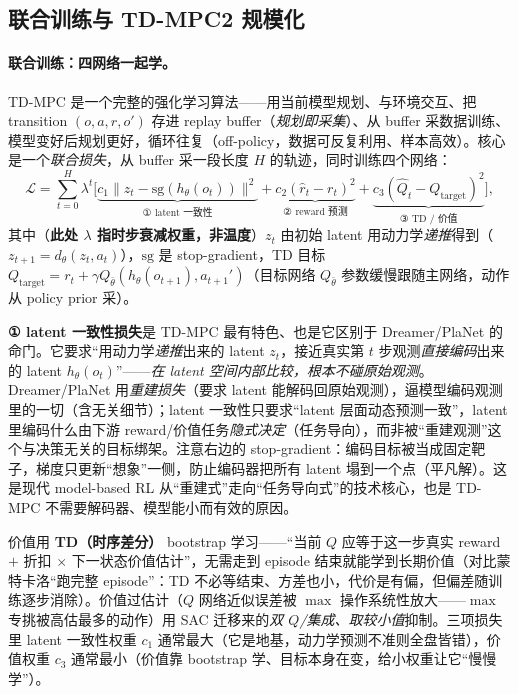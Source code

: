 \subsection{联合训练与 TD-MPC2 规模化}
\label{sec:mv-tdmpc-train}

\paragraph{联合训练：四网络一起学。}
TD-MPC 是一个完整的强化学习算法——用当前模型规划、与环境交互、把 transition $(o,a,r,o')$ 存进 replay buffer（\emph{规划即采集}）、从 buffer 采数据训练、模型变好后规划更好，循环往复（off-policy，数据可反复利用、样本高效）。核心是一个\emph{联合损失}，从 buffer 采一段长度 $H$ 的轨迹，同时训练四个网络\cite{hansen2022tdmpc}：
\begin{equation}
  \mathcal{L}=\sum_{t=0}^{H}\lambda^t\Big[\underbrace{c_1\|z_t-\mathrm{sg}(h_\theta(o_t))\|^2}_{\text{① latent 一致性}}+\underbrace{c_2(\hat r_t-r_t)^2}_{\text{② reward 预测}}+\underbrace{c_3(\hat Q_t-Q_{\text{target}})^2}_{\text{③ TD / 价值}}\Big],
  \label{eq:mv-tdmpc-loss}
\end{equation}
其中（\textbf{此处 $\lambda$ 指时步衰减权重，非温度}）$z_t$ 由初始 latent 用动力学\emph{递推}得到（$z_{t+1}=d_\theta(z_t,a_t)$），$\mathrm{sg}$ 是 stop-gradient，TD 目标 $Q_{\text{target}}=r_t+\gamma Q_{\bar\theta}(h_\theta(o_{t+1}),a_{t+1}')$（目标网络 $Q_{\bar\theta}$ 参数缓慢跟随主网络，动作从 policy prior 采）。

\begin{insight}
\textbf{① latent 一致性损失}是 TD-MPC 最有特色、也是它区别于 Dreamer/PlaNet 的命门。它要求“用动力学\emph{递推}出来的 latent $z_t$，接近真实第 $t$ 步观测\emph{直接编码}出来的 latent $h_\theta(o_t)$”——\emph{在 latent 空间内部比较，根本不碰原始观测}。Dreamer/PlaNet 用\emph{重建损失}（要求 latent 能解码回原始观测），逼模型编码观测里的一切（含无关细节）；latent 一致性只要求“latent 层面动态预测一致”，latent 里编码什么由下游 reward/价值任务\emph{隐式决定}（任务导向），而非被“重建观测”这个与决策无关的目标绑架。注意右边的 stop-gradient：编码目标被当成固定靶子，梯度只更新“想象”一侧，防止编码器把所有 latent 塌到一个点（平凡解）。这是现代 model-based RL 从“重建式”走向“任务导向式”的技术核心，也是 TD-MPC 不需要解码器、模型能小而有效的原因。
\end{insight}

\noindent 价值用 \textbf{TD（时序差分）} bootstrap 学习——“当前 $Q$ 应等于这一步真实 reward $+$ 折扣 $\times$ 下一状态价值估计”，无需走到 episode 结束就能学到长期价值（对比蒙特卡洛“跑完整 episode”：TD 不必等结束、方差也小，代价是有偏，但偏差随训练逐步消除）。价值过估计（$Q$ 网络近似误差被 $\max$ 操作系统性放大——$\max$ 专挑被高估最多的动作）用 SAC 迁移来的\emph{双 $Q$/集成、取较小值}抑制。三项损失里 latent 一致性权重 $c_1$ 通常最大（它是地基，动力学预测不准则全盘皆错），价值权重 $c_3$ 通常最小（价值靠 bootstrap 学、目标本身在变，给小权重让它“慢慢学”）。

